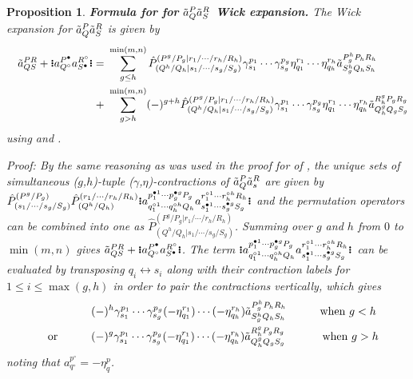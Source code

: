\documentclass[11pt,fleqn]{article}
\newcommand{\g}{\gamma}      %
\newcommand{\h}{\eta}        %
\newcommand{\tl}{\ensuremath{\tilde}}
\newcommand{\op}[1]{\ensuremath{\hat{#1}}}
\renewcommand{\sp}{\hspace{30pt}}
\newcommand{\cd}{\ensuremath{\cdots}}
\newcommand{\bmit}[1]{{\bfseries\itshape\mathversion{bold}#1}}
\newcommand{\GNO}[1]{\setstackgap{S}{0.7pt}\ensuremath{\Shortstack{\textbf{.} \textbf{.} \textbf{.}}#1\Shortstack{\textbf{.} \textbf{.} \textbf{.}}}}
\theoremstyle{mystyle}
\newtheorem{pro}{Proposition}[section]
\numberwithin{equation}{section}
\newcommand{\hole}{\circ}
\newcommand{\ptcl}{\bullet}
\begin{document}
\begin{pro}
\label{aPQaSR-wick-expansion}
\bmit{Formula for for $\tl{a}_Q^P\tl{a}_S^R$ Wick expansion.}
\textit{
The Wick expansion for $\tl{a}_Q^P\tl{a}_S^R$ is given by
\begin{align*}
&&
  \tl{a}_{QS}^{PR}
+
  \GNO{a_{Q^\hole}^{P^\ptcl}a_{S^\ptcl}^{R^\hole}}
=&\
  \sum_{g\leq h}^{\min(m,n)}
  \op{P}_{(Q^h/Q_h|s_1/\cd/s_g/S_g)}
        ^{(P^g/P_g|r_1/\cd/r_h/R_h)}
  \g_{s_1}^{p_1}\cd\g_{s_g}^{p_g}
  \h_{q_1}^{r_1}\cd\h_{q_h}^{r_h}
  \tl{a}_{S_g^hQ_hS_h}
        ^{P_g^hP_hR_h}
\\&&+&\
  \sum_{g>h}^{\min(m,n)}
  (-)^{g+h}
  \op{P}_{(Q^h/Q_h|s_1/\cd/s_g/S_g)}
        ^{(P^g/P_g|r_1/\cd/r_h/R_h)}
  \g_{s_1}^{p_1}\cd\g_{s_g}^{p_g}
  \h_{q_1}^{r_1}\cd\h_{q_h}^{r_h}
  \tl{a}_{Q_h^gQ_gS_g}
        ^{R_h^gP_gR_g}
\end{align*}
using  and .
}
\begin{addmargin}[1em]{0em}
Proof:
By the same reasoning as was used in the proof for of , the unique sets of simultaneous ($g$,$h$)-tuple ($\g$,$\h$)-contractions of $\tl{a}_Q^P\tl{a}_s^R$ are given by
$
  \op{P}_{(s_1/\cd/s_g/S_g)}
        ^{(P^g/P_g)}
  \op{P}_{(Q^h/Q_h)}
        ^{(r_1/\cd/r_h/R_h)}
  \GNO{
    a_{q_1^{\hole1}\cd q_h^{\hole h}Q_h}
     ^{p_1^{\ptcl1}\cd p_g^{\ptcl g}P_g}
    a_{s_1^{\ptcl1}\cd s_g^{\ptcl g}S_g}
     ^{r_1^{\hole1}\cd r_h^{\hole h}R_h}
  }
$
and the permutation operators can be combined into one as
$
  \op{P}_{(Q^h/Q_h|s_1/\cd/s_g/S_g)}
        ^{(P^g/P_g|r_1/\cd/r_h/R_h)}
$.
Summing over $g$ and $h$ from $0$ to $\min(m,n)$ gives
$
  \tl{a}_{QS}^{PR}
+
  \GNO{a_{Q^\hole}^{P^\ptcl}a_{S^\ptcl}^{R^\hole}}
$.
The term
$
  \GNO{
    a_{q_1^{\hole1}\cd q_h^{\hole h}Q_h}
     ^{p_1^{\ptcl1}\cd p_g^{\ptcl g}P_g}
    a_{s_1^{\ptcl1}\cd s_g^{\ptcl g}S_g}
     ^{r_1^{\hole1}\cd r_h^{\hole h}R_h}
  }
$
can be evaluated by transposing $q_i\leftrightarrow s_i$ along with their contraction labels for $1\leq i\leq\max(g,h)$ in order to pair the contractions vertically, which gives
\begin{align*}
&&&
  (-)^h
  \g_{s_1}^{p_1}\cd\g_{s_g}^{p_g}
  (-\h_{q_1}^{r_1})\cd(-\h_{q_h}^{r_h})
  \tl{a}_{S_g^hQ_hS_h}
        ^{P_g^hP_hR_h}
\sp\text{when $g<h$}
\\
&&
\text{or}\sp
&
  (-)^g
  \g_{s_1}^{p_1}\cd\g_{s_g}^{p_g}
  (-\h_{q_1}^{r_1})\cd(-\h_{q_h}^{r_h})
  \tl{a}_{Q_h^gQ_gS_g}
        ^{R_h^gP_gR_g}
\sp\text{\ when $g>h$}
\end{align*}
noting that $a_{q^\hole}^{p^\hole}=-\h_q^p$.
\end{addmargin}
\end{pro}
\end{document}
